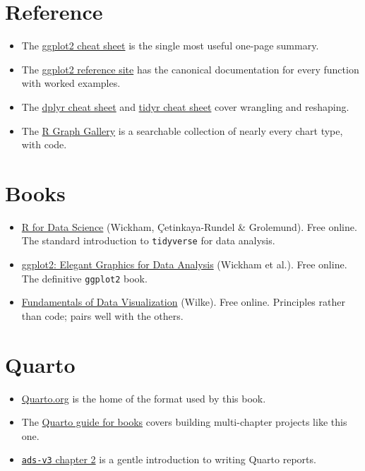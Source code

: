 \documentclass[
  english,
  letterpaper,
]{book}
\providecommand{\tightlist}{%
  \setlength{\itemsep}{0pt}\setlength{\parskip}{0pt}}
\begin{document}
\section{Reference}\label{reference}

\begin{itemize}
\tightlist
\item
  The
  \href{https://rstudio.github.io/cheatsheets/html/data-visualization.html}{ggplot2
  cheat sheet} is the single most useful one-page summary.
\item
  The \href{https://ggplot2.tidyverse.org/reference/index.html}{ggplot2
  reference site} has the canonical documentation for every function
  with worked examples.
\item
  The
  \href{https://rstudio.github.io/cheatsheets/html/data-transformation.html}{dplyr
  cheat sheet} and
  \href{https://rstudio.github.io/cheatsheets/html/data-import.html}{tidyr
  cheat sheet} cover wrangling and reshaping.
\item
  The \href{https://r-graph-gallery.com/}{R Graph Gallery} is a
  searchable collection of nearly every chart type, with code.
\end{itemize}

\section{Books}\label{books}

\begin{itemize}
\tightlist
\item
  \href{https://r4ds.hadley.nz/}{R for Data Science} (Wickham,
  Çetinkaya-Rundel \& Grolemund). Free online. The standard introduction
  to \texttt{tidyverse} for data analysis.
\item
  \href{https://ggplot2-book.org/}{ggplot2: Elegant Graphics for Data
  Analysis} (Wickham et al.). Free online. The definitive
  \texttt{ggplot2} book.
\item
  \href{https://clauswilke.com/dataviz/}{Fundamentals of Data
  Visualization} (Wilke). Free online. Principles rather than code;
  pairs well with the others.
\end{itemize}

\section{Quarto}\label{quarto}

\begin{itemize}
\tightlist
\item
  \href{https://quarto.org/}{Quarto.org} is the home of the format used
  by this book.
\item
  The \href{https://quarto.org/docs/books/}{Quarto guide for books}
  covers building multi-chapter projects like this one.
\item
  \href{https://psyteachr.github.io/ads-v3/02-reports.html}{\texttt{ads-v3}
  chapter 2} is a gentle introduction to writing Quarto reports.
\end{itemize}
\end{document}
